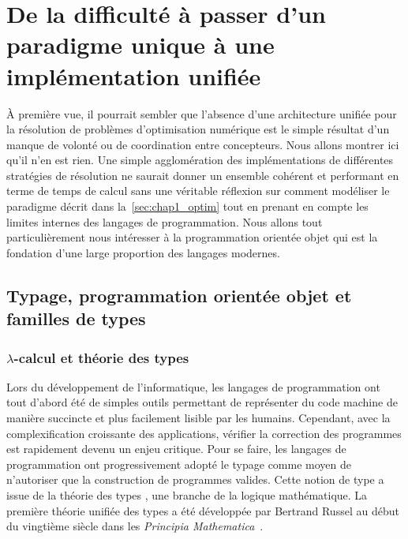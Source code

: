 \section{De la dif\-ficulté à passer d'un paradigme uni\-que à une implémentation unifiée}
\label{sec:chap1_model2impl}


À première vue, il pourrait sembler que l'absence d'une architecture
unifiée pour la résolution de problèmes d'optimisation numérique est
le simple résultat d'un manque de volonté ou de coordination entre
concepteurs. Nous allons montrer ici qu'il n'en est rien. Une simple
agglomération des implémentations de différentes stratégies de
résolution ne saurait donner un ensemble cohérent et performant en
terme de temps de calcul sans une véritable réflexion sur comment
modéliser le paradigme décrit dans la \autoref{sec:chap1_optim}
tout en prenant en compte les limites internes des langages de
programmation. Nous allons tout particulièrement nous intéresser à la
programmation orientée objet qui est la fondation d'une large
proportion des langages modernes.


\subsection{Typage, programmation orientée objet et familles de types}
\label{sec:chap1_model2impl_typage}

\subsubsection{$\lambda$-calcul et théorie des types}
\label{sec:chap1_model2impl_typage_lambda}

Lors du développement de l'informatique, les langages de programmation
ont tout d'abord été de simples outils permettant de représenter du
code machine de manière succincte et plus facilement lisible par les
humains. Cependant, avec la complexification croissante des
applications, vérifier la correction des programmes est rapidement
devenu un enjeu critique. Pour se faire, les langages de programmation
ont progressivement adopté le typage comme moyen de n'autoriser que la
construction de programmes valides. Cette notion de type a issue de la
théorie des types , une branche de la logique
mathématique. La première théorie unifiée des types a été développée
par Bertrand Russel  au début du vingtième
siècle dans les \emph{Principia Mathematica} \citep{10.whitehead}.


